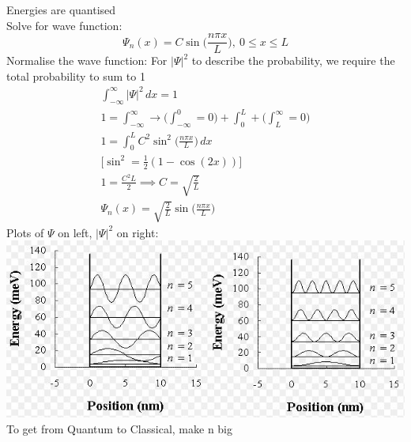 \documentclass[a4paper, 11pt, fleqn, normalem]{report}
\begin{document}
Energies are quantised \\
Solve for wave function:
\begin{equation*}
    \Psi_{n}(x) = C\sin\Big(\frac{n\pi x}{L}\Big),~0 \leq x \leq L
\end{equation*}
Normalise the wave function: For $|\Psi|^{2}$ to describe the probability, we require the total probability to sum to 1
\begin{gather*}
    \int_{-\infty}^{\infty} |\Psi|^{2}\,dx = 1 \\
    1 = \int_{-\infty}^{\infty} \rightarrow \Bigg(\int_{-\infty}^{0} = 0\Bigg) + \int_{0}^{L} + \Bigg(\int_{L}^{\infty} = 0\Bigg) \\
    1 = \int_{0}^{L} C^{2}\sin^{2}\Big(\frac{n\pi x}{L}\Big)\,dx \\
    \Big[\sin^{2} = \frac{1}{2}(1 - \cos(2x))\Big] \\
    1 = \frac{C^{2}L}{2} \implies C = \sqrt{\frac{2}{L}} \\
    \Psi_{n}(x) = \sqrt{\frac{2}{L}}\sin\Big(\frac{n\pi x}{L}\Big)
\end{gather*}
Plots of $\Psi$ on left, $|\Psi|^{2}$ on right: \\
\includegraphics{Squarez.jpg} \\
To get from Quantum to Classical, make n big
\end{document}
